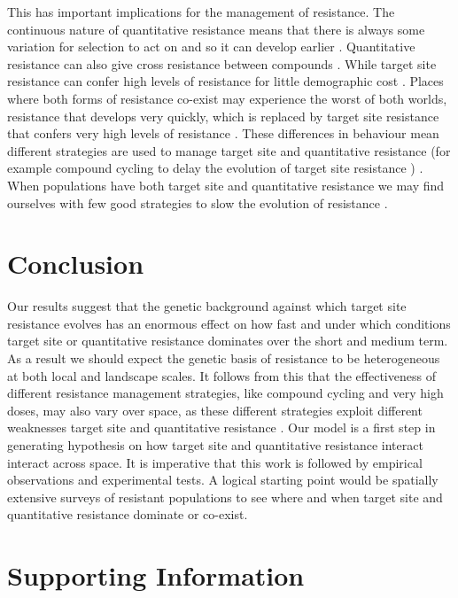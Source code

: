 \documentclass[10pt,letterpaper]{article}
\begin{document}
This has important implications for the management of resistance. The continuous nature of quantitative resistance means that there is always some variation for selection to act on and so it can develop earlier \cite{Dely2010newPhy}. Quantitative resistance can also give cross resistance between compounds \cite{Bauc2016, Neve2007}. While target site resistance can confer high levels of resistance for little demographic cost \cite{Bauc2016}. Places where both forms of resistance co-exist may experience the worst of both worlds, resistance that develops very quickly, which is replaced by target site resistance that confers very high levels of resistance \cite{Vera2015}. These differences in behaviour mean different strategies are used to manage target site and quantitative resistance (for example compound cycling to delay the evolution of target site resistance \cite{Rex2013}) \cite{Gard1998}. When populations have both target site and quantitative resistance we may find ourselves with few good strategies to slow the evolution of resistance \cite{Gard1998}. 

\section*{Conclusion}
Our results suggest that the genetic background against which target site resistance evolves has an enormous effect on how fast and under which conditions target site or quantitative resistance dominates over the short and medium term. As a result we should expect the genetic basis of resistance to be heterogeneous at both local and landscape scales. It follows from this that the effectiveness of different resistance management strategies, like compound cycling and very high doses, may also vary over space, as these different strategies exploit different weaknesses target site and quantitative resistance \cite{Gard1998, Rex2013}. Our model is a first step in generating hypothesis on how target site and quantitative resistance interact interact across space. It is imperative that this work is followed by empirical observations and experimental tests. A logical starting point would be spatially extensive surveys of resistant populations to see where and when target site and quantitative resistance dominate or co-exist.

\section*{Supporting Information}
\end{document}

